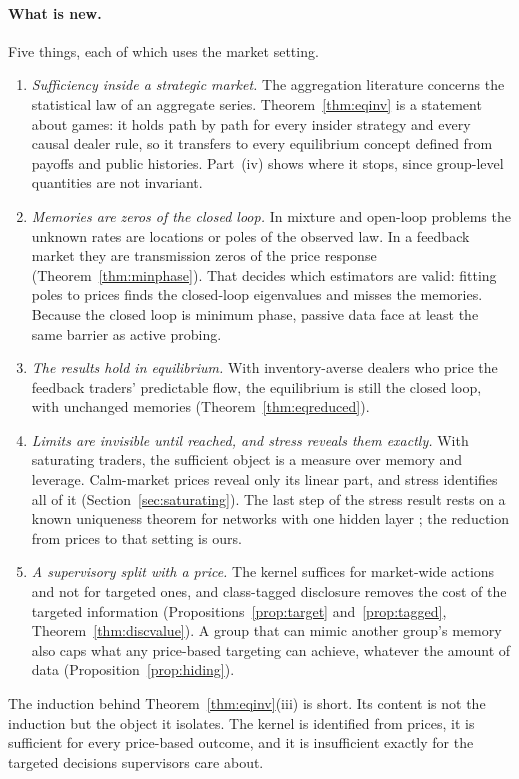 \documentclass[12pt]{article}
\theoremstyle{definition}
\theoremstyle{remark}
\begin{document}
\paragraph{What is new.} Five things, each of which uses the market setting.
\begin{enumerate}[label=(\alph*),leftmargin=*,itemsep=2pt]
\item \emph{Sufficiency inside a strategic market.} The aggregation literature concerns the statistical law of an aggregate series. Theorem~\ref{thm:eqinv} is a statement about games: it holds path by path for every insider strategy and every causal dealer rule, so it transfers to every equilibrium concept defined from payoffs and public histories. Part~(iv) shows where it stops, since group-level quantities are not invariant.
\item \emph{Memories are zeros of the closed loop.} In mixture and open-loop problems the unknown rates are locations or poles of the observed law. In a feedback market they are transmission zeros of the price response (Theorem~\ref{thm:minphase}). That decides which estimators are valid: fitting poles to prices finds the closed-loop eigenvalues and misses the memories. Because the closed loop is minimum phase, passive data face at least the same barrier as active probing.
\item \emph{The results hold in equilibrium.} With inventory-averse dealers who price the feedback traders' predictable flow, the equilibrium is still the closed loop, with unchanged memories (Theorem~\ref{thm:eqreduced}).
\item \emph{Limits are invisible until reached, and stress reveals them exactly.} With saturating traders, the sufficient object is a measure over memory and leverage. Calm-market prices reveal only its linear part, and stress identifies all of it (Section~\ref{sec:saturating}). The last step of the stress result rests on a known uniqueness theorem for networks with one hidden layer \citep{sussmann1992}; the reduction from prices to that setting is ours.
\item \emph{A supervisory split with a price.} The kernel suffices for market-wide actions and not for targeted ones, and class-tagged disclosure removes the cost of the targeted information (Propositions~\ref{prop:target} and~\ref{prop:tagged}, Theorem~\ref{thm:discvalue}). A group that can mimic another group's memory also caps what any price-based targeting can achieve, whatever the amount of data (Proposition~\ref{prop:hiding}).
\end{enumerate}
The induction behind Theorem~\ref{thm:eqinv}(iii) is short. Its content is not the induction but the object it isolates. The kernel is identified from prices, it is sufficient for every price-based outcome, and it is insufficient exactly for the targeted decisions supervisors care about.
\end{document}
